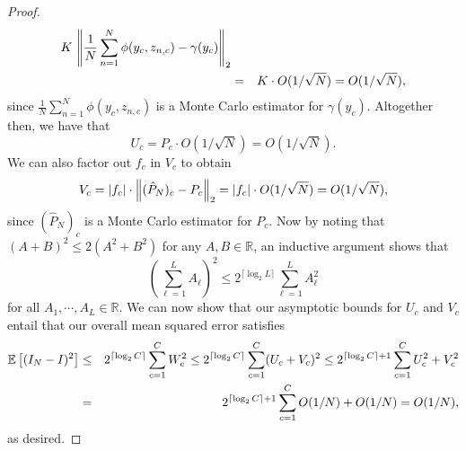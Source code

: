 \begin{proof}
\begin{eqnarray*}
		K \, \left\lVert\frac{1}{N} \sum_{n=1}^N \phi(y_c, z_{n,c}) - \gamma(y_c)\right\rVert_2  \\	
		&=& K \cdot O(1/\sqrt{N}) 
		= O(1/\sqrt{N}),
	\end{eqnarray*}
	since $\frac{1}{N} \sum_{n=1}^N \phi(y_c, z_{n,c})$ is a Monte Carlo estimator for
	$\gamma(y_c)$. Altogether then, we have that
	\[
	U_c = P_c \cdot O(1 / \sqrt{N}) = O(1 / \sqrt{N}).
	\]
	We can also factor out $f_c$ in $V_c$ to obtain
	\[
	V_c = |f_c| \cdot \left\lVert(\hat{P}_N)_c - P_c\right\rVert_2 = |f_c| \cdot O(1/\sqrt{N}) = O(1/\sqrt{N}),
	\]
	since $(\hat{P}_N)_c$ is a Monte Carlo estimator for $P_c$.
	Now by noting that 
	$(A+B)^2 \le 2(A^2+B^2)$
	for any $A, B \in \mathbb{R}$, an inductive argument shows that 
	\[
	\left(\sum_{\ell=1}^L A_\ell\right)^2 \leq 2^{\lceil \log_2 L \rceil} \sum_{\ell=1}^L A_\ell^2
	\]
	for all $A_1, \cdots, A_L \in \mathbb{R}$.  We can now show that
	our asymptotic bounds for $U_c$ and $V_c$ entail that our overall mean squared
	error satisfies
	\begin{eqnarray}
	\mathbb{E}\left[(I_N - I)^2\right] &\leq& 2^{\lceil \log_2 C \rceil} \sum_{c=1}^C W_c^2 \label{eq:square-inequal-1} \notag
	\leq 2^{\lceil \log_2 C \rceil} \sum_{c=1}^C (U_c + V_c)^2 \notag
	\leq 2^{\lceil \log_2 C \rceil + 1} \sum_{c=1}^C U_c^2 + V_c^2 \label{eq:square-inequal-2} \notag \\
	&=& 2^{\lceil \log_2 C \rceil + 1} \sum_{c=1}^C O(1/N) + O(1/N) \notag
	= O(1/N), \notag
	\end{eqnarray}
	as desired.
\end{proof}